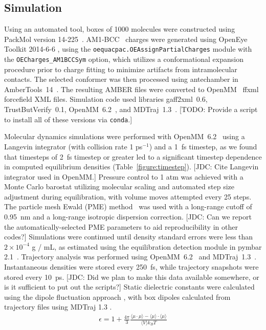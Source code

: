 \documentclass[aps,pre,twocolumn,nofootinbib,superscriptaddress,linenumbers]{revtex4-1}
\begin{document}
\subsection{Simulation}
Using an automated tool, boxes of 1000 molecules were constructed using PackMol version 14-225~\cite{martinez2009packmol}.
AM1-BCC~\cite{am1bcc1,am1bcc2} charges were generated using OpenEye Toolkit 2014-6-6 \cite{openeye}, using the {\tt oequacpac.OEAssignPartialCharges} module with the {\tt OECharges\_AM1BCCSym} option, which utilizes a conformational expansion procedure prior to charge fitting to minimize artifacts from intramolecular contacts.  
The selected conformer was then processed using antechamber in AmberTools~14~\cite{amber14}.  
The resulting AMBER files were converted to OpenMM~\cite{eastman2012openmm} ffxml forcefield XML files.  
Simulation code used libraries gaff2xml~0.6, TrustButVerify~0.1, OpenMM~6.2~\cite{eastman2012openmm}, and MDTraj~1.3~\cite{mcgibbon2014mdtraj}.  
{\color{red}[TODO: Provide a script to install all of these versions via {\tt conda}.]}

Molecular dynamics simulations were performed with OpenMM~6.2~\cite{eastman2012openmm} using a Langevin integrator (with collision rate 1 ps$^{-1}$) and a 1~fs timestep, as we found that timesteps of 2~fs timestep or greater led to a significant timestep dependence in computed equilibrium densities (Table~\ref{figure:timestep}).  
{\color{red}[JDC: Cite Langevin integrator used in OpenMM.]}
Pressure control to 1 atm was achieved with a Monte Carlo barostat utilizing molecular scaling and automated step size adjustment during equilibration, with volume moves attempted every 25 steps.  
The particle mesh Ewald (PME) method~\cite{Darden1993} was used with a long-range cutoff of 0.95~nm and a long-range isotropic dispersion correction. 
{\color{red}[JDC: Can we report the automatically-selected PME parameters to aid reproducibility in other codes?]}
Simulations were continued until density standard errors were less than $2 \times 10^{-4}$ g / mL, as estimated using the equilibration detection module in pymbar 2.1~\cite{shirts2008statistically}.  
Trajectory analysis was performed using OpenMM~6.2~\cite{eastman2012openmm} and MDTraj~1.3~\cite{mcgibbon2014mdtraj}.  
Instantaneous densities were stored every 250~fs, while trajectory snapshots were stored every 10~ps.  
{\color{red}[JDC: Did we plan to make this data available somewhere, or is it sufficient to put out the scripts?]}
Static dielectric constants were calculated using the dipole fluctuation approach \cite{horn2004}, with box dipoles calculated from trajectory files using MDTraj 1.3 \cite{mcgibbon2014mdtraj}.
\begin{eqnarray}
\epsilon = 1 + \frac{4\pi}{3} \frac{\langle \mu \cdot \mu \rangle - \langle \mu \rangle \cdot \langle \mu \rangle}{\langle V \rangle k_B T} \label{equation:dielectric_calculation}
\end{eqnarray}
\end{document}
